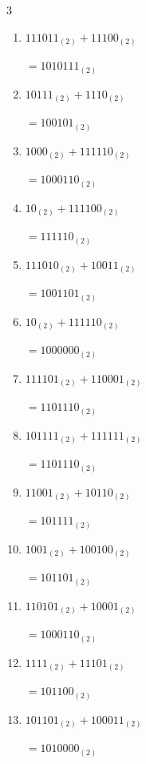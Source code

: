 \begin{multicols}{3}
\begin{enumerate}
        $=111110_{(2)}$

  \item $111011_{(2)} + 11100_{(2)}$

        $=1010111_{(2)}$

\columnbreak %

  \item $10111_{(2)} + 1110_{(2)}$

        $=100101_{(2)}$

  \item $1000_{(2)} + 111110_{(2)}$

        $=1000110_{(2)}$

  \item $10_{(2)} + 111100_{(2)}$

        $=111110_{(2)}$

  \item $111010_{(2)} + 10011_{(2)}$

        $=1001101_{(2)}$

  \item $10_{(2)} + 111110_{(2)}$

        $=1000000_{(2)}$

  \item $111101_{(2)} + 110001_{(2)}$

        $=1101110_{(2)}$

  \item $101111_{(2)} + 111111_{(2)}$

        $=1101110_{(2)}$

  \item $11001_{(2)} + 10110_{(2)}$

        $=101111_{(2)}$

  \item $1001_{(2)} + 100100_{(2)}$

        $=101101_{(2)}$

  \item $110101_{(2)} + 10001_{(2)}$

        $=1000110_{(2)}$

\columnbreak %

\resetques

  \item $1111_{(2)} + 11101_{(2)}$

        $=101100_{(2)}$

  \item $101101_{(2)} + 100011_{(2)}$

        $=1010000_{(2)}$


\end{enumerate}
\end{multicols}
